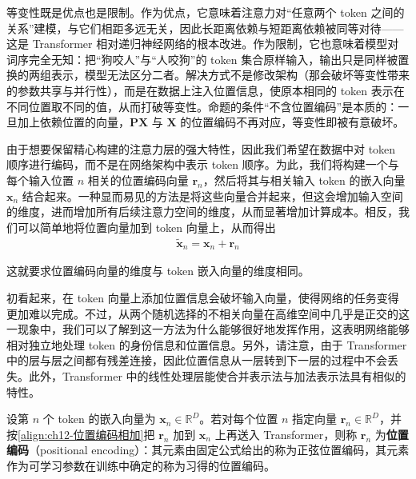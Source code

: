 \documentclass[../../main.tex]{subfiles}
\begin{document}
\begin{remark}
等变性既是优点也是限制。作为优点，它意味着注意力对“任意两个 token 之间的关系”建模，与它们相距多远无关，因此长距离依赖与短距离依赖被同等对待——这是 Transformer 相对递归神经网络的根本改进。作为限制，它也意味着模型对词序完全无知：把“狗咬人”与“人咬狗”的 token 集合原样输入，输出只是同样被置换的两组表示，模型无法区分二者。解决方式不是修改架构（那会破坏等变性带来的参数共享与并行性），而是在数据上注入位置信息，使原本相同的 token 表示在不同位置取不同的值，从而打破等变性。命题的条件“不含位置编码”是本质的：一旦加上依赖位置的向量，$\mathbf{P}\mathbf{X}$ 与 $\mathbf{X}$ 的位置编码不再对应，等变性即被有意破坏。
\end{remark}

由于想要保留精心构建的注意力层的强大特性，因此我们希望在数据中对 token 顺序进行编码，而不是在网络架构中表示 token 顺序。为此，我们将构建一个与每个输入位置 $n$ 相关的位置编码向量 $\mathbf{r}_n$，然后将其与相关输入 token 的嵌入向量 $\mathbf{x}_n$ 结合起来。一种显而易见的方法是将这些向量合并起来，但这会增加输入空间的维度，进而增加所有后续注意力空间的维度，从而显著增加计算成本。相反，我们可以简单地将位置向量加到 token 向量上，从而得出
\begin{align}
\tilde{\mathbf{x}}_n=\mathbf{x}_n+\mathbf{r}_n
\label{align:ch12-位置编码相加}
\end{align}

这就要求位置编码向量的维度与 token 嵌入向量的维度相同。

初看起来，在 token 向量上添加位置信息会破坏输入向量，使得网络的任务变得更加难以完成。不过，从两个随机选择的不相关向量在高维空间中几乎是正交的这一现象中，我们可以了解到这一方法为什么能够很好地发挥作用，这表明网络能够相对独立地处理 token 的身份信息和位置信息。另外，请注意，由于 Transformer 中的层与层之间都有残差连接，因此位置信息从一层转到下一层的过程中不会丢失。此外，Transformer 中的线性处理层能使合并表示法与加法表示法具有相似的特性。

\begin{definition}[位置编码]\label{definition:ch12-位置编码}
设第 $n$ 个 token 的嵌入向量为 $\mathbf{x}_n\in\mathbb{R}^{D}$。若对每个位置 $n$ 指定向量 $\mathbf{r}_n\in\mathbb{R}^{D}$，并按\eqref{align:ch12-位置编码相加}把 $\mathbf{r}_n$ 加到 $\mathbf{x}_n$ 上再送入 Transformer，则称 $\mathbf{r}_n$ 为\textbf{位置编码}（positional encoding）：其元素由固定公式给出的称为正弦位置编码，其元素作为可学习参数在训练中确定的称为习得的位置编码。
\end{definition}
\end{document}
